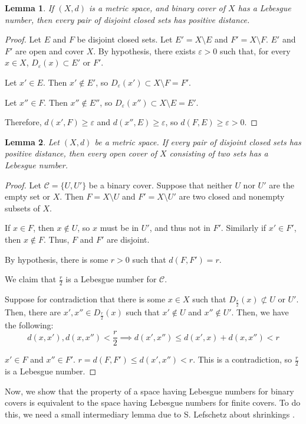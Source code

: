 \documentclass[openany, amssymb, psamsfonts]{amsart}
\newtheorem{lem}{Lemma}[section]
\theoremstyle{definition}
\numberwithin{equation}{section}
\begin{document}
\begin{lem}\label{lem:4.1}
  If $(X,d)$ is a metric space, and binary cover of $X$ has a Lebesgue number, then every pair of disjoint closed sets has positive distance.
\end{lem}
\begin{proof}
  Let $E$ and $F$ be disjoint closed sets. Let $E' = X \setminus E$ and $F' = X \setminus F$. $E'$ and $F'$ are open and cover $X$. By hypothesis, there exists $\varepsilon >0$ such that, for every $x \in X$, $D_\varepsilon(x) \subset E'$ or $F'$. 

  Let $x' \in E$. Then $x' \not\in E'$, so $D_\varepsilon(x') \subset X \setminus F = F'$. 

  Let $x'' \in F$. Then $x'' \not\in E''$, so $D_\varepsilon(x'')\subset X \setminus E = E'$. 

  Therefore, $d(x', F) \ge \varepsilon$ and $d(x'', E) \ge \varepsilon$, so $d(F, E) \ge \varepsilon > 0$.
\end{proof}
\begin{lem} \label{lem:4.2}
Let $(X,d)$ be a metric space. If every pair of disjoint closed sets has positive distance, then every open cover of $X$ consisting of two sets has a Lebesgue number.
\end{lem}
\begin{proof}
  Let $\mathcal{C} = \{U, U'\}$ be a binary cover. Suppose that neither $U$ nor $U'$ are the empty set or $X$. Then $F = X \setminus U$ and $F' = X \setminus U'$ are two closed and nonempty subsets of $X$. 

  If $x \in F$, then $x \not \in U$, so $x$ must be in $U'$, and thus not in $F'$. Similarly if $x' \in F'$, then $x \not\in F$. Thus, $F$ and $F'$ are disjoint. 

  By hypothesis, there is some $r > 0$ such that $d(F, F') = r$. 

  We claim that $\frac{r}2$ is a Lebesgue number for $\mathcal{C}$. 

  Suppose for contradiction that there is some $x \in X$ such that $D_{\frac{r}2}(x) \not\subset U$ or $ U'$.  Then, there are $x', x'' \in D_{\frac{r}2}(x)$ such that $x' \not \in U$ and $x'' \not\in U'$. Then, we have the following:
  \[
    d(x,x'), d(x,x'') < \frac{r}2 \implies d(x', x'') \le d(x', x) + d(x, x'') < r
  \]
  
  $x' \in F$ and $x'' \in F'$. $r = d(F, F')\le d(x', x'') < r$. This is a contradiction, so $\frac{r}2$ is a Lebesgue number.
\end{proof}
Now, we show that the property of a space having Lebesgue numbers for binary covers is equivalent to the space having Lebesgue numbers for finite covers. To do this, we need a small intermediary lemma due to S. Lefschetz  about shrinkings \cite{lefschetz}.
\end{document}
